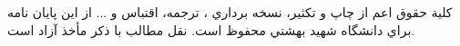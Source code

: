 \ \\ \\ \\ \\ \\ \\ \\
{\dav
\begin{center}
كلية حقوق اعم از چاپ و تكثير، نسخه برداري ، ترجمه، اقتباس و ... از اين پايان نامه براي دانشگاه شهيد بهشتي محفوظ است.
 نقل  مطالب با ذكر مأخذ آزاد است.
\end{center}
}